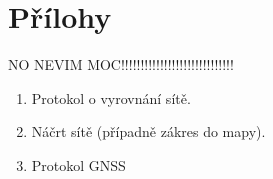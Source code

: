 \section{Přílohy}
NO NEVIM MOC!!!!!!!!!!!!!!!!!!!!!!!!!!!!!


\begin{enumerate}
    \item Protokol o vyrovnání sítě.
    \item Náčrt sítě (případně zákres do mapy).
    \item Protokol GNSS
\end{enumerate}


